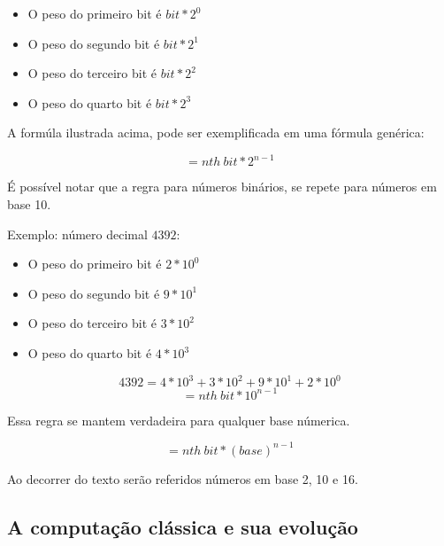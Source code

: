 \begin{itemize}
  \item O peso do primeiro bit é $bit * 2^0$
  \item O peso do segundo bit é $bit * 2^1$
  \item O peso do terceiro bit é $bit * 2^2$
  \item O peso do quarto bit é $bit * 2^3$
\end{itemize}

A formúla ilustrada acima, pode ser exemplificada em uma fórmula genérica: 

\[= nth\: bit * 2^{n-1}\]

É possível notar que a regra para números binários, se repete para números em base 10.

Exemplo: número decimal $4392$:
\begin{itemize}
  \item O peso do primeiro bit é $2 * 10^0$
  \item O peso do segundo bit é $9 * 10^1$
  \item O peso do terceiro bit é $3 * 10^2$
  \item O peso do quarto bit é $4 * 10^3$
\end{itemize}
\[ 4392 = 4*10^3 + 3*10^2 + 9*10^1 + 2*10^0\]
\[= nth\: bit * 10^{n-1}\]

Essa regra se mantem verdadeira para qualquer base númerica.

\[= nth\: bit * (base)^{n-1}\]

Ao decorrer do texto serão referidos números em base 2, 10 e 16. 

\subsection{A computação clássica e sua evolução}
\newpage
